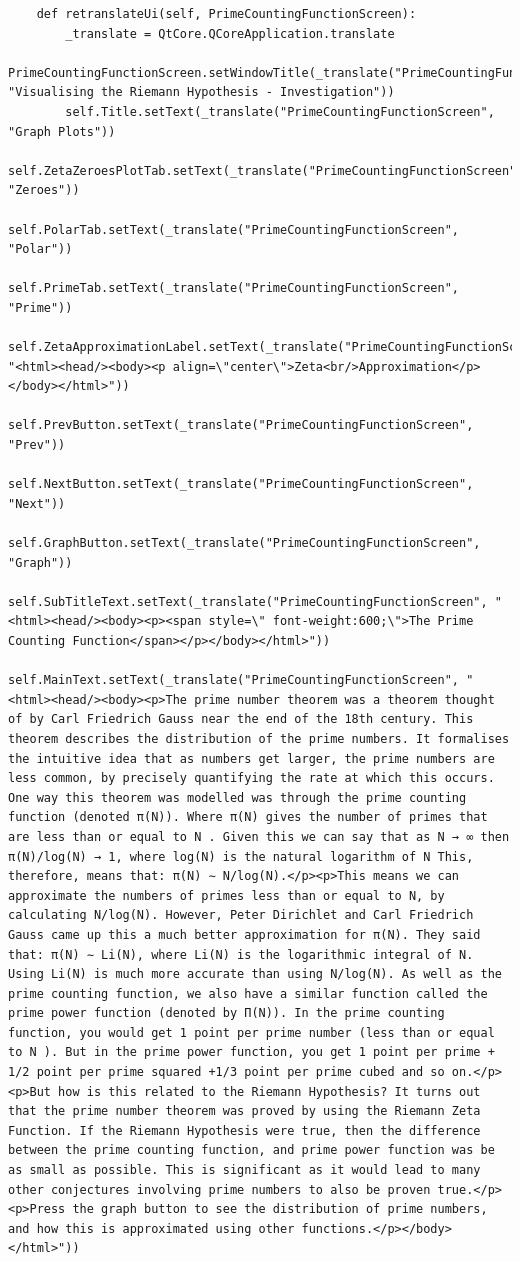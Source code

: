 \documentclass[12pt]{article}
\begin{document}
\begin{lstlisting}
    def retranslateUi(self, PrimeCountingFunctionScreen):
        _translate = QtCore.QCoreApplication.translate
        PrimeCountingFunctionScreen.setWindowTitle(_translate("PrimeCountingFunctionScreen", "Visualising the Riemann Hypothesis - Investigation"))
        self.Title.setText(_translate("PrimeCountingFunctionScreen", "Graph Plots"))
        self.ZetaZeroesPlotTab.setText(_translate("PrimeCountingFunctionScreen", "Zeroes"))
        self.PolarTab.setText(_translate("PrimeCountingFunctionScreen", "Polar"))
        self.PrimeTab.setText(_translate("PrimeCountingFunctionScreen", "Prime"))
        self.ZetaApproximationLabel.setText(_translate("PrimeCountingFunctionScreen", "<html><head/><body><p align=\"center\">Zeta<br/>Approximation</p></body></html>"))
        self.PrevButton.setText(_translate("PrimeCountingFunctionScreen", "Prev"))
        self.NextButton.setText(_translate("PrimeCountingFunctionScreen", "Next"))
        self.GraphButton.setText(_translate("PrimeCountingFunctionScreen", "Graph"))
        self.SubTitleText.setText(_translate("PrimeCountingFunctionScreen", "<html><head/><body><p><span style=\" font-weight:600;\">The Prime Counting Function</span></p></body></html>"))
        self.MainText.setText(_translate("PrimeCountingFunctionScreen", "<html><head/><body><p>The prime number theorem was a theorem thought of by Carl Friedrich Gauss near the end of the 18th century. This theorem describes the distribution of the prime numbers. It formalises the intuitive idea that as numbers get larger, the prime numbers are less common, by precisely quantifying the rate at which this occurs. One way this theorem was modelled was through the prime counting function (denoted π(N)). Where π(N) gives the number of primes that are less than or equal to N . Given this we can say that as N → ∞ then π(N)/log(N) → 1, where log(N) is the natural logarithm of N This, therefore, means that: π(N) ∼ N/log(N).</p><p>This means we can approximate the numbers of primes less than or equal to N, by calculating N/log(N). However, Peter Dirichlet and Carl Friedrich Gauss came up this a much better approximation for π(N). They said that: π(N) ∼ Li(N), where Li(N) is the logarithmic integral of N. Using Li(N) is much more accurate than using N/log(N). As well as the prime counting function, we also have a similar function called the prime power function (denoted by Π(N)). In the prime counting function, you would get 1 point per prime number (less than or equal to N ). But in the prime power function, you get 1 point per prime + 1/2 point per prime squared +1/3 point per prime cubed and so on.</p><p>But how is this related to the Riemann Hypothesis? It turns out that the prime number theorem was proved by using the Riemann Zeta Function. If the Riemann Hypothesis were true, then the difference between the prime counting function, and prime power function was be as small as possible. This is significant as it would lead to many other conjectures involving prime numbers to also be proven true.</p><p>Press the graph button to see the distribution of prime numbers, and how this is approximated using other functions.</p></body></html>"))
\end{lstlisting}
\end{document}
